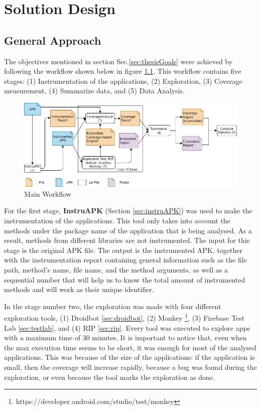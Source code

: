 \chapter{Solution Design} %
\label{Chapter3} %
\section{General Approach} \label{sec:generalApproach}

The objectives mentioned in section Sec.\ref{sec:thesisGoals} were achieved by following the workflow shown below in figure \ref{fig:workflow}. This workflow contains five stages: (1) Instrumentation of the applications, (2) Exploration, (3) Coverage measurement, (4) Summarize data, and (5)  Data Analysis. 

\begin{figure}[h]
\centering
\includegraphics[width=\textwidth]{../Figures/workflow.jpg}
\caption{Main Workflow}\label{fig:workflow}
\end{figure}

For the first stage, \textbf{InstruAPK} (Section \ref{sec:instruAPK}) was used to make the instrumentation of the applications. This tool only takes into account the methods under the package name of the application that is being analysed. As a result, methods from different libraries are not instrumented. The input for this stage is the original APK file. The output is the instrumented APK, together with the instrumentation report containing general information such as the file path, method's name, file name, and the method arguments, as well as a sequential number that will help us to know the total amount of instrumented methods and will work as their unique identifier.

In the stage number two, the exploration was made with four different exploration tools, (1) Droidbot \ref{sec:droidbot}, (2) Monkey \footnote{https://developer.android.com/studio/test/monkey}, (3) Firebase Test Lab \ref{sec:testlab}, and (4) RIP \ref{sec:rip}. Every tool was executed to explore apps with a maximum time of 30 minutes. It is important to notice that, even when the max execution time seems to be short, it was enough for most of the analysed applications. This was because of the size of the applications: if the application is small, then the coverage will increase rapidly, because a bug was found during the exploration, or even because the tool marks the exploration as done. 

